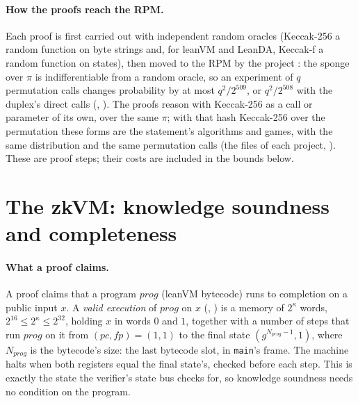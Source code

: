 \documentclass[11pt]{article}
\begin{document}
\paragraph{How the proofs reach the RPM.} Each proof is first carried out with independent random
oracles (Keccak-256 a random function on byte strings and, for leanVM and LeanDA, Keccak-f a random
function on states), then moved to the RPM by the project : the sponge over $\pi$ is
indifferentiable from a random oracle, so an experiment of $q$ permutation calls changes
probability by at most $q^2/2^{509}$, or $q^2/2^{508}$ with the duplex's direct calls
(, ). The proofs reason with Keccak-256 as a call or parameter of its own, over
the same $\pi$; with that hash Keccak-256 over the permutation these forms are the statement's
algorithms and games, with the same distribution and the same permutation calls (the
 files of each project, ). These are proof steps; their
costs are included in the bounds below.

\section{The zkVM: knowledge soundness and completeness}\label{sec:zkvm}

\paragraph{What a proof claims.} A proof claims that a program $\mathit{prog}$ (leanVM bytecode) runs to
completion on a public input $x$. A \emph{valid execution} of $\mathit{prog}$ on $x$ (,
) is a memory of $2^\kappa$ words, $2^{16} \le 2^\kappa \le 2^{32}$,
holding $x$ in words $0$ and $1$, together with a number of steps that run $\mathit{prog}$ on it from
$(\mathit{pc}, \mathit{fp}) = (1, 1)$ to the final state $(g^{N_{\mathit{prog}}-1}, 1)$, where $N_{\mathit{prog}}$ is the
bytecode's size: the last bytecode slot, in \texttt{main}'s frame. The machine halts when both
registers equal the final state's, checked before each step. This is exactly the state the
verifier's state bus checks for, so knowledge soundness needs no condition on the program.
\end{document}
